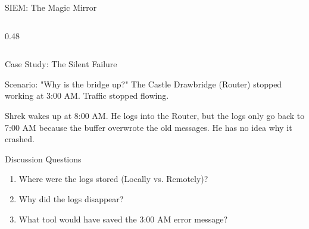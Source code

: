 \documentclass[aspectratio=169]{beamer}  %
\begin{document}
\begin{frame}{SIEM: The Magic Mirror}
\begin{columns}[T]
\begin{column}{0.48\textwidth}
\begin{center}
            \end{center}
        \end{column}
    \end{columns}
\end{frame}

\begin{frame}{Case Study: The Silent Failure}
    \begin{alertblock}{Scenario: "Why is the bridge up?"}
        \footnotesize
        The Castle Drawbridge (Router) stopped working at 3:00 AM. Traffic stopped flowing.
        
        Shrek wakes up at 8:00 AM. He logs into the Router, but the logs only go back to 7:00 AM because the buffer overwrote the old messages. He has no idea why it crashed.
    \end{alertblock}
    \begin{block}{Discussion Questions}
        \footnotesize
        \begin{enumerate}
            \item Where were the logs stored (Locally vs. Remotely)?
            \item Why did the logs disappear?
            \item What tool would have saved the 3:00 AM error message?
        \end{enumerate}
    \end{block}
\end{frame}
\end{document}
